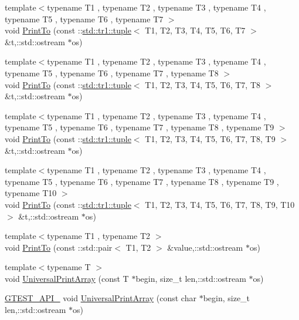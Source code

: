 \begin{DoxyCompactItemize}
\item 
{\footnotesize template$<$typename T1 , typename T2 , typename T3 , typename T4 , typename T5 , typename T6 , typename T7 $>$ }\\void \hyperlink{namespacetesting_1_1internal_aa3a910677d224678f1074520bc4f625f}{Print\-To} (const \-::\hyperlink{classstd_1_1tr1_1_1tuple}{std\-::tr1\-::tuple}$<$ T1, T2, T3, T4, T5, T6, T7 $>$ \&t,\-::std\-::ostream $\ast$os)
\item 
{\footnotesize template$<$typename T1 , typename T2 , typename T3 , typename T4 , typename T5 , typename T6 , typename T7 , typename T8 $>$ }\\void \hyperlink{namespacetesting_1_1internal_a0f47a6e3634be969039e1e6eb902934f}{Print\-To} (const \-::\hyperlink{classstd_1_1tr1_1_1tuple}{std\-::tr1\-::tuple}$<$ T1, T2, T3, T4, T5, T6, T7, T8 $>$ \&t,\-::std\-::ostream $\ast$os)
\item 
{\footnotesize template$<$typename T1 , typename T2 , typename T3 , typename T4 , typename T5 , typename T6 , typename T7 , typename T8 , typename T9 $>$ }\\void \hyperlink{namespacetesting_1_1internal_ad15d6fe963a626de83caee897c8221bc}{Print\-To} (const \-::\hyperlink{classstd_1_1tr1_1_1tuple}{std\-::tr1\-::tuple}$<$ T1, T2, T3, T4, T5, T6, T7, T8, T9 $>$ \&t,\-::std\-::ostream $\ast$os)
\item 
{\footnotesize template$<$typename T1 , typename T2 , typename T3 , typename T4 , typename T5 , typename T6 , typename T7 , typename T8 , typename T9 , typename T10 $>$ }\\void \hyperlink{namespacetesting_1_1internal_ab4c216410a9d9080b63f19a31a18c76a}{Print\-To} (const \-::\hyperlink{classstd_1_1tr1_1_1tuple}{std\-::tr1\-::tuple}$<$ T1, T2, T3, T4, T5, T6, T7, T8, T9, T10 $>$ \&t,\-::std\-::ostream $\ast$os)
\item 
{\footnotesize template$<$typename T1 , typename T2 $>$ }\\void \hyperlink{namespacetesting_1_1internal_a5759c5abed8ebab0e1a8a0f8aadab768}{Print\-To} (const \-::std\-::pair$<$ T1, T2 $>$ \&value,\-::std\-::ostream $\ast$os)
\item 
{\footnotesize template$<$typename T $>$ }\\void \hyperlink{namespacetesting_1_1internal_a73b5046a2ed65d0e2fb7cdc9bdaee3fe}{Universal\-Print\-Array} (const T $\ast$begin, size\-\_\-t len,\-::std\-::ostream $\ast$os)
\item 
\hyperlink{gtest-port_8h_aa73be6f0ba4a7456180a94904ce17790}{G\-T\-E\-S\-T\-\_\-\-A\-P\-I\-\_\-} void \hyperlink{namespacetesting_1_1internal_a3fac293aeb6e7e6b3ff3e27404f6588b}{Universal\-Print\-Array} (const char $\ast$begin, size\-\_\-t len,\-::std\-::ostream $\ast$os)

\end{DoxyCompactItemize}
